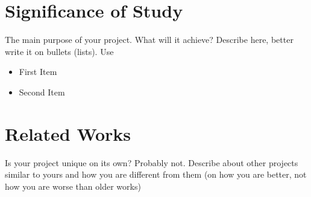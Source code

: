 \section{Significance of Study}

The main purpose of your project. What will it achieve? Describe here, better write it on bullets (lists). Use 
\begin{itemize}

\item First Item

\item Second Item

\end{itemize}


\section{Related Works}

Is your project unique on its own? Probably not. Describe about other projects similar to yours and how you are different from them (on how you are better, not how you are worse than older works)

